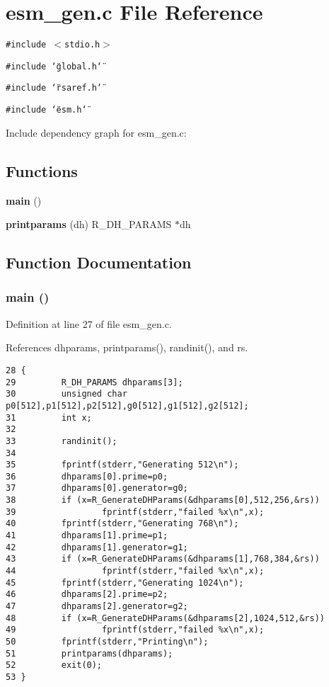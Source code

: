 \section{esm\_\-gen.c File Reference}
\label{esm__gen_8c}


{\tt \#include $<$stdio.h$>$}\par
{\tt \#include \char`\"{}global.h\char`\"{}}\par
{\tt \#include \char`\"{}rsaref.h\char`\"{}}\par
{\tt \#include \char`\"{}esm.h\char`\"{}}\par


Include dependency graph for esm\_\-gen.c:\subsection*{Functions}
\begin{CompactItemize}
\item 
{\bf main} ()
\item 
{\bf printparams} (dh) R\_\-DH\_\-PARAMS $\ast$dh
\end{CompactItemize}


\subsection{Function Documentation}
\subsubsection{\setlength{\rightskip}{0pt plus 5cm}main ()}\label{esm__gen_8c_a0}




Definition at line 27 of file esm\_\-gen.c.

References dhparams, printparams(), randinit(), and rs.



\footnotesize\begin{verbatim}28 {
29         R_DH_PARAMS dhparams[3];
30         unsigned char p0[512],p1[512],p2[512],g0[512],g1[512],g2[512];
31         int x;
32         
33         randinit();
34 
35         fprintf(stderr,"Generating 512\n");
36         dhparams[0].prime=p0;
37         dhparams[0].generator=g0;
38         if (x=R_GenerateDHParams(&dhparams[0],512,256,&rs))
39                 fprintf(stderr,"failed %x\n",x);
40         fprintf(stderr,"Generating 768\n");
41         dhparams[1].prime=p1;
42         dhparams[1].generator=g1;
43         if (x=R_GenerateDHParams(&dhparams[1],768,384,&rs))
44                 fprintf(stderr,"failed %x\n",x);
45         fprintf(stderr,"Generating 1024\n");
46         dhparams[2].prime=p2;
47         dhparams[2].generator=g2;
48         if (x=R_GenerateDHParams(&dhparams[2],1024,512,&rs))
49                 fprintf(stderr,"failed %x\n",x);
50         fprintf(stderr,"Printing\n");
51         printparams(dhparams);
52         exit(0);
53 }
\end{verbatim}\normalsize 


